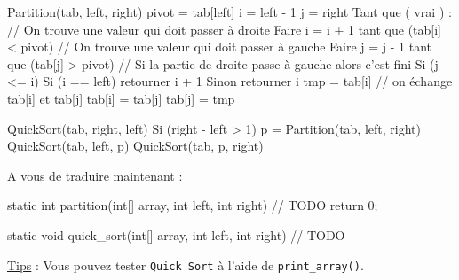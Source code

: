 \begin{code}
Partition(tab, left, right)
	pivot = tab[left]
    i = left - 1
    j = right
    Tant que ( vrai ) :
    	// On trouve une valeur qui doit passer à droite
    	Faire
        	i = i + 1
        	tant que (tab[i] < pivot)
        // On  trouve une valeur qui doit passer à gauche
        Faire
        	j = j - 1
        	tant que (tab[j] > pivot)
       	// Si la partie de droite passe à gauche alors c'est fini
       	Si (j <= i)
        	Si (i == left)
            	retourner i + 1
            Sinon
            	retourner i
       tmp = tab[i] // on échange tab[i] et tab[j]
       tab[i] = tab[j]
       tab[j] = tmp
\end{code}

\begin{code}
QuickSort(tab, right, left)
	Si (right - left > 1)
    	p = Partition(tab, left, right)
        QuickSort(tab, left, p)
        QuickSort(tab, p, right)
\end{code}

A vous de traduire maintenant :

\begin{code}
static int partition(int[] array, int left, int right)
{
	// TODO
    return 0;
}
\end{code}

\begin{code}
static void quick_sort(int[] array, int left, int right)
{
	// TODO
}
\end{code}

\underline{Tips} : Vous pouvez tester \texttt{Quick Sort} à l'aide de \texttt{print\_array()}.


